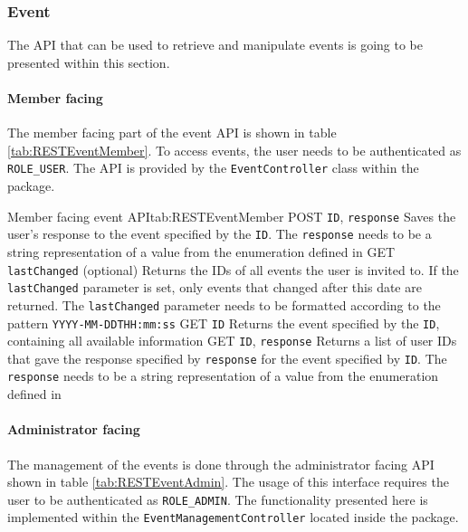\subsubsection{Event}

The \gls{API} that can be used to retrieve and manipulate events is going to be presented within this section. 

\paragraph{Member facing}
The member facing part of the event \gls{API} is shown in table \vref{tab:RESTEventMember}. To access events, the user needs to be authenticated as \texttt{ROLE\_USER}. The \gls{API} is provided by the \texttt{EventController} class within the  package.

\begin{RESTTable}{Member facing event API}{tab:RESTEventMember}
		{POST}
		{\texttt{ID}, \texttt{response}}
		{Saves the user's response to the event specified by the \texttt{ID}. The \texttt{response} needs to be a string representation of a value from the enumeration defined in }
		{GET}
		{\texttt{lastChanged} (optional)}
		{Returns the IDs of all events the user is invited to. If the \texttt{lastChanged} parameter is set, only events that changed after this date are returned. The \texttt{lastChanged} parameter needs to be formatted according to the pattern \texttt{YYYY-MM-DDTHH:mm:ss}}
		{GET}
		{\texttt{ID}}
		{Returns the event specified by the \texttt{ID}, containing all available information}
		{GET}
		{\texttt{ID}, \texttt{response}}
		{Returns a list of user IDs that gave the response specified by \texttt{response} for the event specified by \texttt{ID}. The \texttt{response} needs to be a string representation of a value from the enumeration defined in }
\end{RESTTable}

\paragraph{Administrator facing}
The management of the events is done through the administrator facing \gls{API} shown in table \vref{tab:RESTEventAdmin}. The usage of this interface requires the user to be authenticated as \texttt{ROLE\_ADMIN}. The functionality presented here is implemented within the \texttt{EventManagementController} located inside the  package.

